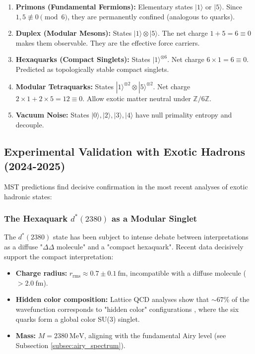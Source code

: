\documentclass[11pt, a4paper]{article}
\theoremstyle{plain}
\theoremstyle{definition}
\newcommand{\Zmod}{\mathbb{Z}/6\mathbb{Z}}
\begin{document}
\begin{enumerate}
    \item \textbf{Primons (Fundamental Fermions):} Elementary states $|1\rangle$ or $|5\rangle$. Since $1,5 \not\equiv 0 \pmod{6}$, they are permanently confined (analogous to quarks).
    
    \item \textbf{Duplex (Modular Mesons):} States $|1\rangle \otimes |5\rangle$. The net charge $1+5=6 \equiv 0$ makes them observable. They are the effective force carriers.
    
    \item \textbf{Hexaquarks (Compact Singlets):} States $|1\rangle^{\otimes 6}$. Net charge $6 \times 1 = 6 \equiv 0$. Predicted as topologically stable compact singlets.
    
    \item \textbf{Modular Tetraquarks:} States $|1\rangle^{\otimes 2} \otimes |5\rangle^{\otimes 2}$. Net charge $2\times1 + 2\times5 = 12 \equiv 0$. Allow exotic matter neutral under $\Zmod$.
    
    \item \textbf{Vacuum Noise:} States $|0\rangle, |2\rangle, |3\rangle, |4\rangle$ have null primality entropy and decouple.
\end{enumerate}

\subsection{Experimental Validation with Exotic Hadrons (2024-2025)}

MST predictions find decisive confirmation in the most recent analyses of exotic hadronic states:

\subsubsection{The Hexaquark \texorpdfstring{$d^*(2380)$}{d*(2380)} as a Modular Singlet}

The $d^*(2380)$ state has been subject to intense debate between interpretations as a diffuse "$\Delta\Delta$ molecule" and a "compact hexaquark". Recent data \cite{Bashkanov2024} decisively support the compact interpretation:

\begin{itemize}
    \item \textbf{Charge radius:} $r_{\text{rms}} \approx 0.7 \pm 0.1\ \si{\femto\meter}$, incompatible with a diffuse molecule ($>2.0\ \si{\femto\meter}$).
    
    \item \textbf{Hidden color composition:} Lattice QCD analyses show that $\sim 67\%$ of the wavefunction corresponds to "hidden color" configurations \cite{Lu2017}, where the six quarks form a global color SU(3) singlet.
    
    \item \textbf{Mass:} $M = 2380\ \si{\mega\electronvolt}$, aligning with the fundamental Airy level (see Subsection \ref{subsec:airy_spectrum}).
\end{itemize}
\end{document}

